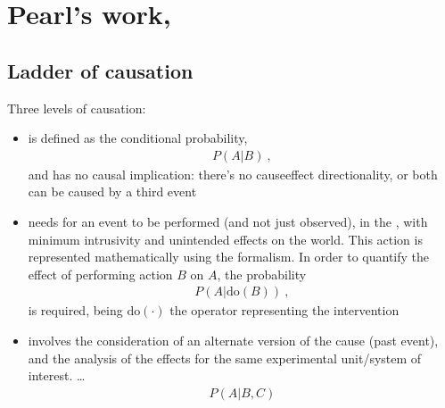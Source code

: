 \documentclass[letterpaper,10pt,english]{jupyterBook}
\begin{document}
\section{Pearl’s work, }
\label{\detokenize{code/notebooks/correlation_vs_causation:pearl-s-work-causal-inference-in-statistics-a-primer}}

\subsection{Ladder of causation}
\label{\detokenize{code/notebooks/correlation_vs_causation:ladder-of-causation}}
\sphinxAtStartPar
Three levels of causation:
\begin{itemize}
\item {} 
\sphinxAtStartPar
{} is defined as the conditional probability,
\begin{equation*}
\begin{split}P(A|B) \ ,\end{split}
\end{equation*}
\sphinxAtStartPar
and has no causal implication: there’s no cause\sphinxhyphen{}effect directionality, or both can be caused by a third event

\item {} 
\sphinxAtStartPar
{} needs for an event to be performed (and not just observed), in the , with minimum intrusivity and unintended effects on the world. This action is represented mathematically using the  formalism. In order to quantify the effect of performing action \(B\) on \(A\), the probability
\begin{equation*}
\begin{split}P(A| \text{do}(B)) \ ,\end{split}
\end{equation*}
\sphinxAtStartPar
is required, being \(\text{do}(\cdot)\) the operator representing the intervention

\item {} 
\sphinxAtStartPar
{} involves the consideration of an alternate version of the cause (past event), and the analysis of the effects for the same experimental unit/system of interest. …
\begin{equation*}
\begin{split}P(A| B, C)\end{split}
\end{equation*}
\end{itemize}
\end{document}

